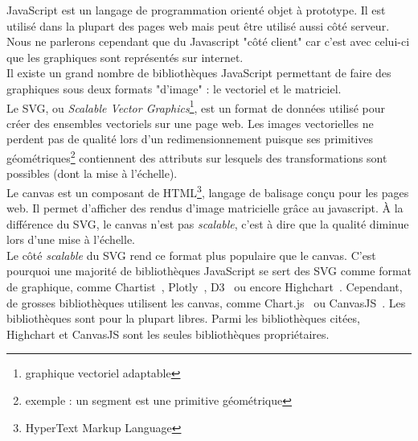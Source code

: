 JavaScript est un langage de programmation orienté objet à prototype. Il est utilisé dans la plupart des pages web mais peut être utilisé aussi côté serveur. Nous ne parlerons cependant que du Javascript "côté client" car c'est avec celui-ci que les graphiques sont représentés sur internet.\\

Il existe un grand nombre de bibliothèques JavaScript permettant de faire des graphiques sous deux formats "d'image" : le vectoriel et le matriciel.\\

Le SVG, ou \textit{Scalable Vector Graphics}\footnote{graphique vectoriel adaptable}, est un format de données utilisé pour créer des ensembles vectoriels sur une page web. Les images vectorielles ne perdent pas de qualité lors d'un redimensionnement puisque ses primitives géométriques\footnote{exemple : un segment est une primitive géométrique} contiennent des attributs sur lesquels des transformations sont possibles (dont la mise à l'échelle).\\

Le canvas est un composant de HTML\footnote{HyperText Markup Language}, langage de balisage conçu pour les pages web. Il permet d'afficher des rendus d'image matricielle grâce au javascript. À la différence du SVG, le canvas n'est pas \textit{scalable}, c'est à dire que la qualité diminue lors d'une mise à l'échelle.\\

Le côté \textit{scalable} du SVG rend ce format plus populaire que le canvas. C'est pourquoi une majorité de bibliothèques JavaScript se sert des SVG comme format de graphique, comme Chartist~\cite{chartist}, Plotly~\cite{plotly}, D3~\cite{d3} ou encore Highchart~\cite{highcharts}. Cependant, de grosses bibliothèques utilisent les canvas, comme Chart.js~\cite{chartjs} ou CanvasJS~\cite{canvasjs}. Les bibliothèques sont pour la plupart libres. Parmi les bibliothèques citées, Highchart et CanvasJS sont les seules bibliothèques propriétaires.